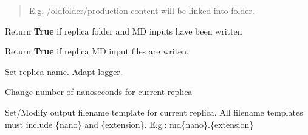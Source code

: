 \documentclass[letterpaper,10pt,english]{sphinxmanual}
\begin{document}
\begin{fulllineitems}
\begin{fulllineitems}
\begin{quote}
\begin{description}
\begin{description}
\end{description}

E.g. /oldfolder/production content will be linked into  folder.

\end{description}\end{quote}

\end{fulllineitems}


\begin{fulllineitems}
\label{replicas:pyMDMix.Replicas.Replica.iscreated}
Return \textbf{True} if replica folder and MD inputs have been written

\end{fulllineitems}


\begin{fulllineitems}
\label{replicas:pyMDMix.Replicas.Replica.mdinputwritten}
Return \textbf{True} if replica MD input files are writen.

\end{fulllineitems}


\begin{fulllineitems}
\label{replicas:pyMDMix.Replicas.Replica.setName}
Set replica name. Adapt logger.

\end{fulllineitems}


\begin{fulllineitems}
\label{replicas:pyMDMix.Replicas.Replica.setNanos}
Change number of nanoseconds for current replica

\end{fulllineitems}


\begin{fulllineitems}
\label{replicas:pyMDMix.Replicas.Replica.setOutFileTemplate}
Set/Modify output filename template for current replica. All filename templates must include \{nano\} and \{extension\}.
E.g.: md\{nano\}.\{extension\}


\end{fulllineitems}
\end{fulllineitems}
\end{document}
